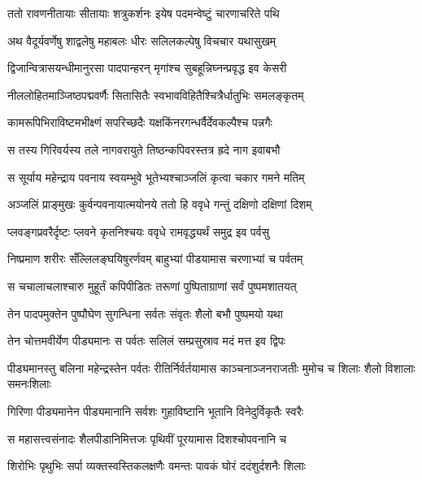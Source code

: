 

\twolineshloka
{ततो रावणनीतायाः सीतायाः शत्रुकर्शनः}
{इयेष पदमन्वेष्टुं चारणाचरिते पथि} %

\twolineshloka
{अथ वैदूर्यवर्णेषु शाद्वलेषु महाबलः}
{धीरः सलिलकल्पेषु विचचार यथासुखम्} %

\twolineshloka
{द्विजान्वित्रासयन्धीमानुरसा पादपान्हरन्}
{मृगांश्च सुबहून्निघ्नन्प्रवृद्ध इव केसरी} %

\twolineshloka
{नीललोहितमाञ्जिष्ठपद्मवर्णैः सितासितैः}
{स्वभावविहितैश्चित्रैर्धातुभिः समलङ्कृतम्} %

\twolineshloka
{कामरूपिभिराविष्टमभीक्ष्णं सपरिच्छदैः}
{यक्षकिंनरगन्धर्वैर्देवकल्पैश्च पन्नगैः} %

\twolineshloka
{स तस्य गिरिवर्यस्य तले नागवरायुते}
{तिष्ठन्कपिवरस्तत्र ह्रदे नाग इवाबभौ} %

\twolineshloka
{स सूर्याय महेन्द्राय पवनाय स्वयम्भुवे}
{भूतेभ्यश्चाञ्जलिं कृत्वा चकार गमने मतिम्} %

\twolineshloka
{अञ्जलिं प्राङ्मुखः कुर्वन्पवनायात्मयोनये}
{ततो हि ववृधे गन्तुं दक्षिणो दक्षिणां दिशम्} %

\twolineshloka
{प्लवङ्गप्रवरैर्दृष्टः प्लवने कृतनिश्चयः}
{ववृधे रामवृद्ध्यर्थं समुद्र इव पर्वसु} %

\twolineshloka
{निष्प्रमाण शरीरः सँल्लिलङ्घयिषुरर्णवम्}
{बाहुभ्यां पीडयामास चरणाभ्यां च पर्वतम्} %

\twolineshloka
{स चचालाचलाश्चारु मुहूर्तं कपिपीडितः}
{तरूणां पुष्पिताग्राणां सर्वं पुष्पमशातयत्} %

\twolineshloka
{तेन पादपमुक्तेन पुष्पौघेण सुगन्धिना}
{सर्वतः संवृतः शैलो बभौ पुष्पमयो यथा} %

\twolineshloka
{तेन चोत्तमवीर्येण पीड्यमानः स पर्वतः}
{सलिलं सम्प्रसुस्राव मदं मत्त इव द्विपः} %

\threelineshloka
{पीड्यमानस्तु बलिना महेन्द्रस्तेन पर्वतः}
{रीतिर्निर्वर्तयामास काञ्चनाञ्जनराजतीः}
{मुमोच च शिलाः शैलो विशालाः समनःशिलाः} %

\twolineshloka
{गिरिणा पीड्यमानेन पीड्यमानानि सर्वशः}
{गुहाविष्टानि भूतानि विनेदुर्विकृतैः स्वरैः} %

\twolineshloka
{स महासत्त्वसंनादः शैलपीडानिमित्तजः}
{पृथिवीं पूरयामास दिशश्चोपवनानि च} %

\twolineshloka
{शिरोभिः पृथुभिः सर्पा व्यक्तस्वस्तिकलक्षणैः}
{वमन्तः पावकं घोरं ददंशुर्दशनैः शिलाः} %

